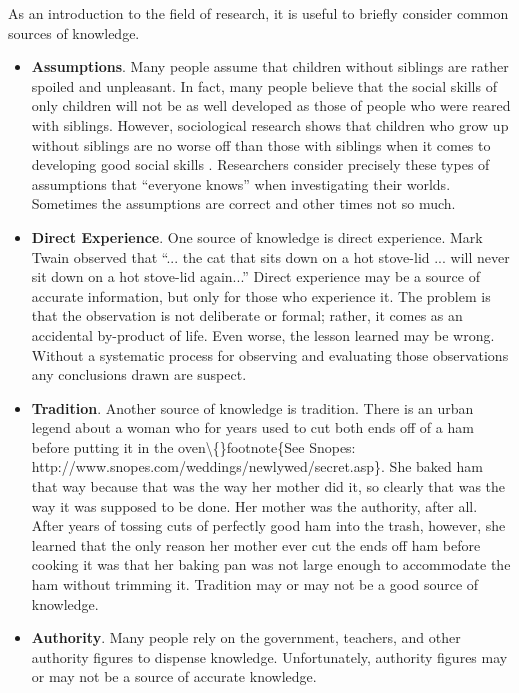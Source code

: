 As an introduction to the field of research, it is useful to briefly consider common sources of knowledge. 

\begin{itemize}
	\item \textbf{Assumptions}. Many people assume that children without siblings are rather spoiled and unpleasant. In fact, many people believe that the social skills of only children will not be as well developed as those of people who were reared with siblings. However, sociological research shows that children who grow up without siblings are no worse off than those with siblings when it comes to developing good social skills \cite{bobbitt2013number}. Researchers consider precisely these types of assumptions that ``everyone knows'' when investigating their worlds. Sometimes the assumptions are correct and other times not so much.
	
	\item \textbf{Direct Experience}. One source of knowledge is direct experience. Mark Twain observed that ``... the cat that sits down on a hot stove-lid ... will never sit down on a hot stove-lid again...''\cite{twain2014following} Direct experience may be a source of accurate information, but only for those who experience it. The problem is that the observation is not deliberate or formal; rather, it comes as an accidental by-product of life. Even worse, the lesson learned may be wrong. Without a systematic process for observing and evaluating those observations any conclusions drawn are suspect.

	\item \textbf{Tradition}. Another source of knowledge is tradition. There is an urban legend about a woman who for years used to cut both ends off of a ham before putting it in the oven\textbackslash\{\}footnote\{See Snopes: http://www.snopes.com/weddings/newlywed/secret.asp\}. She baked ham that way because that was the way her mother did it, so clearly that was the way it was supposed to be done. Her mother was the authority, after all. After years of tossing cuts of perfectly good ham into the trash, however, she learned that the only reason her mother ever cut the ends off ham before cooking it was that her baking pan was not large enough to accommodate the ham without trimming it. Tradition may or may not be a good source of knowledge.
	
	\item \textbf{Authority}. Many people rely on the government, teachers, and other authority figures to dispense knowledge. Unfortunately, authority figures may or may not be a source of accurate knowledge.
	

\end{itemize}
